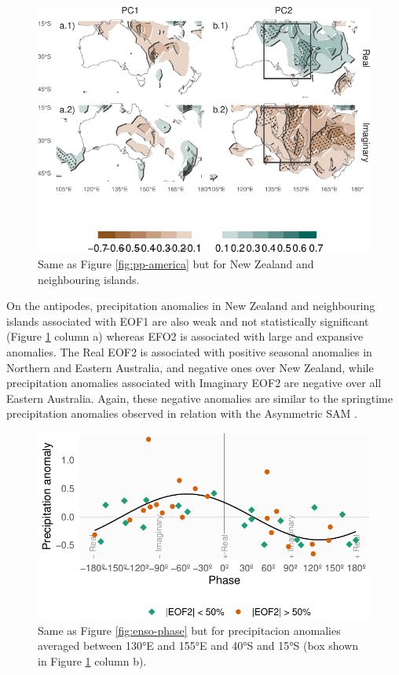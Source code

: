 \documentclass[smallextended]{svjour3}       %
\begin{document}
\begin{figure}
\centering
\includegraphics{../figures/pp-oceania-1.pdf}
\caption{\label{fig:pp-oceania}Same as Figure \ref{fig:pp-america} but for New Zealand and neighbouring islands.}
\end{figure}

On the antipodes, precipitation anomalies in New Zealand and neighbouring islands associated with EOF1 are also weak and not statistically significant (Figure \ref{fig:pp-oceania} column a) whereas EFO2 is associated with large and expansive anomalies. The Real EOF2 is associated with positive seasonal anomalies in Northern and Eastern Australia, and negative ones over New Zealand, while precipitation anomalies associated with Imaginary EOF2 are negative over all Eastern Australia. Again, these negative anomalies are similar to the springtime precipitation anomalies observed in relation with the Asymmetric SAM \citep{campitelli2021}.



\begin{figure}
\centering
\includegraphics{../figures/australia-pp-phase-1.pdf}
\caption{\label{fig:australia-pp-phase}Same as Figure \ref{fig:enso-phase} but for precipitacion anomalies averaged between 130°E and 155°E and 40°S and 15°S (box shown in Figure \ref{fig:pp-oceania} column b).}
\end{figure}
\end{document}
